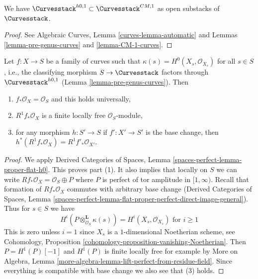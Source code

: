 \begin{lemma}
\label{lemma-pre-genus-in-CM-1}
We have $\Curvesstack^{h0, 1} \subset \Curvesstack^{CM, 1}$
as open substacks of $\Curvesstack$.
\end{lemma}

\begin{proof}
See Algebraic Curves, Lemma \ref{curves-lemma-automatic} and
Lemmas \ref{lemma-pre-genus-curves} and \ref{lemma-CM-1-curves}.
\end{proof}

\begin{lemma}
\label{lemma-genus}
Let $f : X \to S$ be a family of curves such that
$\kappa(s) = H^0(X_s, \mathcal{O}_{X_s})$ for all $s \in S$, i.e.,
the classifying morphism $S \to \Curvesstack$ factors
through $\Curvesstack^{h0, 1}$ (Lemma \ref{lemma-pre-genus-curves}). Then
\begin{enumerate}
\item $f_*\mathcal{O}_X = \mathcal{O}_S$ and this holds universally,
\item $R^1f_*\mathcal{O}_X$ is a finite locally free $\mathcal{O}_S$-module,
\item for any morphism $h : S' \to S$ if $f' : X' \to S'$ is the base change,
then $h^*(R^1f_*\mathcal{O}_X) = R^1f'_*\mathcal{O}_{X'}$.
\end{enumerate}
\end{lemma}

\begin{proof}
We apply Derived Categories of Spaces, Lemma
\ref{spaces-perfect-lemma-proper-flat-h0}.
This proves part (1). It also implies that locally on $S$
we can write $Rf_*\mathcal{O}_X = \mathcal{O}_S \oplus P$
where $P$ is perfect of tor amplitude in $[1, \infty)$.
Recall that formation of $Rf_*\mathcal{O}_X$ commutes
with arbitrary base change
(Derived Categories of Spaces, Lemma
\ref{spaces-perfect-lemma-flat-proper-perfect-direct-image-general}).
Thus for $s \in S$ we have
$$
H^i(P \otimes_{\mathcal{O}_S}^\mathbf{L} \kappa(s)) =
H^i(X_s, \mathcal{O}_{X_s})
\text{ for }i \geq 1
$$
This is zero unless $i = 1$ since $X_s$ is a $1$-dimensional
Noetherian scheme, see
Cohomology, Proposition \ref{cohomology-proposition-vanishing-Noetherian}.
Then $P = H^1(P)[-1]$ and $H^1(P)$ is finite locally free
for example by More on Algebra, Lemma
\ref{more-algebra-lemma-lift-perfect-from-residue-field}.
Since everything is compatible with base change we
also see that (3) holds.
\end{proof}

